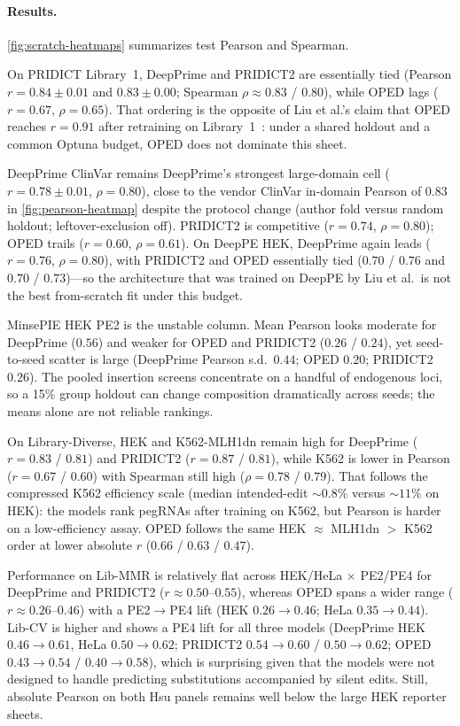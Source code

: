 \documentclass{article}
\begin{document}
\paragraph{Results.}
\autoref{fig:scratch-heatmaps} summarizes test Pearson and Spearman.

On PRIDICT Library~1, DeepPrime and PRIDICT2 are essentially tied (Pearson $r = 0.84 \pm 0.01$ and $0.83 \pm 0.00$; Spearman $\rho \approx 0.83$ / $0.80$), while OPED lags ($r = 0.67$, $\rho = 0.65$). That ordering is the opposite of Liu et al.'s claim that OPED reaches $r = 0.91$ after retraining on Library~1~\cite{liuDesignPrimeeditingGuide2023}: under a shared holdout and a common Optuna budget, OPED does not dominate this sheet.

DeepPrime ClinVar remains DeepPrime's strongest large-domain cell ($r = 0.78 \pm 0.01$, $\rho = 0.80$), close to the vendor ClinVar in-domain Pearson of $0.83$ in \autoref{fig:pearson-heatmap} despite the protocol change (author fold versus random holdout; leftover-exclusion off). PRIDICT2 is competitive ($r = 0.74$, $\rho = 0.80$); OPED trails ($r = 0.60$, $\rho = 0.61$). On DeepPE HEK, DeepPrime again leads ($r = 0.76$, $\rho = 0.80$), with PRIDICT2 and OPED essentially tied ($0.70$ / $0.76$ and $0.70$ / $0.73$)---so the architecture that was trained on DeepPE by Liu et al.\ is not the best from-scratch fit under this budget.

MinsePIE HEK PE2 is the unstable column. Mean Pearson looks moderate for DeepPrime ($0.56$) and weaker for OPED and PRIDICT2 ($0.26$ / $0.24$), yet seed-to-seed scatter is large (DeepPrime Pearson s.d.\ $0.44$; OPED $0.20$; PRIDICT2 $0.26$). The pooled insertion screens concentrate on a handful of endogenous loci, so a 15\% group holdout can change composition dramatically across seeds; the means alone are not reliable rankings.

On Library-Diverse, HEK and K562-MLH1dn remain high for DeepPrime ($r = 0.83$ / $0.81$) and PRIDICT2 ($r = 0.87$ / $0.81$), while K562 is lower in Pearson ($r = 0.67$ / $0.60$) with Spearman still high ($\rho = 0.78$ / $0.79$). That follows the compressed K562 efficiency scale (median intended-edit ${\sim}0.8\%$ versus ${\sim}11\%$ on HEK): the models rank pegRNAs after training on K562, but Pearson is harder on a low-efficiency assay. OPED follows the same HEK $\approx$ MLH1dn $>$ K562 order at lower absolute $r$ ($0.66$ / $0.63$ / $0.47$).

Performance on Lib-MMR is relatively flat across HEK/HeLa $\times$ PE2/PE4 for DeepPrime and PRIDICT2 ($r \approx 0.50$--$0.55$), whereas OPED spans a wider range ($r \approx 0.26$--$0.46$) with a PE2$\to$PE4 lift (HEK $0.26 \to 0.46$; HeLa $0.35 \to 0.44$). Lib-CV is higher and shows a PE4 lift for all three models (DeepPrime HEK $0.46 \to 0.61$, HeLa $0.50 \to 0.62$; PRIDICT2 $0.54 \to 0.60$ / $0.50 \to 0.62$; OPED $0.43 \to 0.54$ / $0.40 \to 0.58$), which is surprising given that the models were not designed to handle predicting substitutions accompanied by silent edits. Still, absolute Pearson on both Hsu panels remains well below the large HEK reporter sheets.
\end{document}
